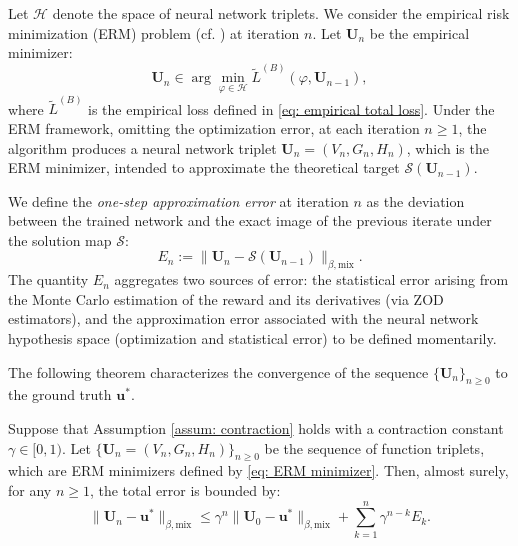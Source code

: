 \documentclass[twoside,11pt]{article}
\newcommand{\1}{\mathbf{1}}
\numberwithin{equation}{section}
\begin{document}
Let $\mathcal{H}$ denote the space of neural network triplets.
We consider the empirical risk minimization (ERM) problem (cf. \citealt{shalev2014understanding}) at iteration $n$. Let $\mathbf{U}_n$ be the empirical minimizer:
\begin{equation}\label{eq: ERM minimizer}
    \mathbf{U}_n \in \arg\min_{\varphi \in \mathcal{H}} \tilde L^{(B)}(\varphi, \mathbf{U}_{n-1}),
\end{equation}
where $\tilde L^{(B)}$ is the empirical loss defined in \eqref{eq: empirical total loss}.
Under the ERM framework, omitting the optimization error, at each iteration $n \ge 1$, the algorithm produces a neural network triplet $\mathbf{U}_n = (V_n, G_n, H_n)$, which is the ERM minimizer, intended to approximate the theoretical target $ \mathcal{S}(\mathbf{U}_{n-1})$.

We define the {\it one-step approximation error} at iteration $n$ as the deviation between the trained network and the exact image of the previous iterate under the solution map $\mathcal{S}$:
\begin{equation} \label{eq: one_step_error_def}
    E_n := \|\mathbf{U}_n - \mathcal{S}(\mathbf{U}_{n-1})\|_{\beta, \text{mix}}.
\end{equation}
The quantity $E_n$ aggregates two sources of error: the statistical error arising from the Monte Carlo estimation of the reward and its derivatives (via ZOD estimators), and the approximation error associated with the neural network hypothesis space (optimization and statistical error) to be defined momentarily.

The following theorem characterizes the convergence of the sequence $\{\mathbf{U}_n\}_{n\ge 0}$ to the ground truth $\mathbf{u}^*$.

\begin{theorem}
\label{thm: global_convergence}
Suppose that Assumption \ref{assum: contraction} holds with a contraction constant $\gamma \in [0, 1)$. Let $\{\mathbf{U}_n = (V_n,G_n,H_n)\}_{n \ge 0}$ be the sequence of function triplets, which are ERM minimizers defined by \eqref{eq: ERM minimizer}. Then, almost surely, for any $n \ge 1$, the total error is bounded by:
\begin{equation} \label{eq: global_bound}
    \|\mathbf{U}_n - \mathbf{u}^*\|_{\beta, \text{mix}} \le \gamma^n \|\mathbf{U}_0 - \mathbf{u}^*\|_{\beta, \text{mix}} + \sum_{k=1}^n \gamma^{n-k} E_k.
\end{equation}
\end{theorem}
\end{document}
